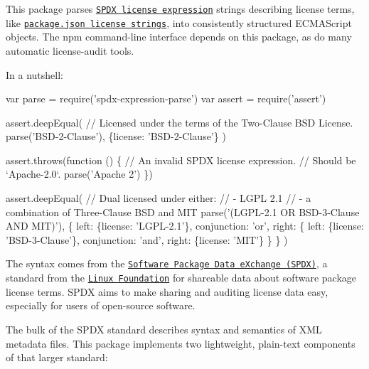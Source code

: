 This package parses \href{https://spdx.org/spdx-specification-21-web-version#h.jxpfx0ykyb60}{\tt S\+P\+DX license expression} strings describing license terms, like \href{https://docs.npmjs.com/files/package.json#license}{\tt package.\+json license strings}, into consistently structured E\+C\+M\+A\+Script objects. The npm command-\/line interface depends on this package, as do many automatic license-\/audit tools.

In a nutshell\+:


\begin{DoxyCode}
var parse = require('spdx-expression-parse')
var assert = require('assert')

assert.deepEqual(
  // Licensed under the terms of the Two-Clause BSD License.
  parse('BSD-2-Clause'),
  \{license: 'BSD-2-Clause'\}
)

assert.throws(function () \{
  // An invalid SPDX license expression.
  // Should be `Apache-2.0`.
  parse('Apache 2')
\})

assert.deepEqual(
  // Dual licensed under either:
  // - LGPL 2.1
  // - a combination of Three-Clause BSD and MIT
  parse('(LGPL-2.1 OR BSD-3-Clause AND MIT)'),
  \{
    left: \{license: 'LGPL-2.1'\},
    conjunction: 'or',
    right: \{
      left: \{license: 'BSD-3-Clause'\},
      conjunction: 'and',
      right: \{license: 'MIT'\}
    \}
  \}
)
\end{DoxyCode}


The syntax comes from the \href{https://spdx.org/}{\tt Software Package Data e\+Xchange (S\+P\+DX)}, a standard from the \href{https://www.linuxfoundation.org}{\tt Linux Foundation} for shareable data about software package license terms. S\+P\+DX aims to make sharing and auditing license data easy, especially for users of open-\/source software.

The bulk of the S\+P\+DX standard describes syntax and semantics of X\+ML metadata files. This package implements two lightweight, plain-\/text components of that larger standard\+:


